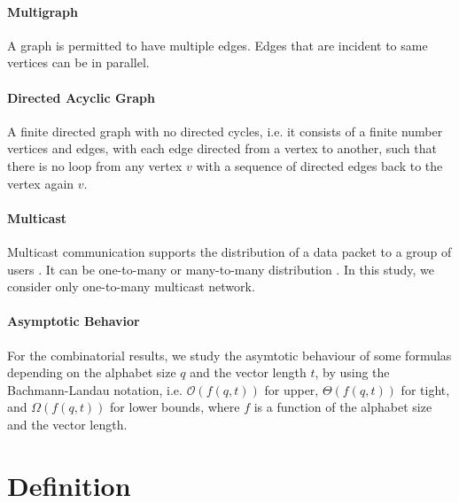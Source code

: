 \paragraph{Multigraph}

A graph is permitted to have multiple edges. Edges that are incident
to same vertices can be in parallel. 

\paragraph{Directed Acyclic Graph}

A finite directed graph with no directed cycles, i.e. it consists
of a finite number vertices and edges, with each edge directed from
a vertex to another, such that there is no loop from any vertex $v$
with a sequence of directed edges back to the vertex again $v$.

\paragraph{Multicast}

Multicast communication supports the distribution of a data packet
to a group of users \cite{Zhang:2012}. It can be one-to-many or many-to-many
distribution \cite{Harte:2008}. In this study, we consider only one-to-many
multicast network.

\paragraph{Asymptotic Behavior}

For the combinatorial results, we study the asymtotic behaviour of
some formulas depending on the alphabet size $q$ and the vector length
$t$, by using the Bachmann-Landau notation, i.e. $\mathcal{O}\left(f\left(q,t\right)\right)$
for upper, $\Theta\left(f\left(q,t\right)\right)$ for tight, and
$\Omega\left(f\left(q,t\right)\right)$ for lower bounds, where $f$
is a function of the alphabet size and the vector length.

\section{Definition}

